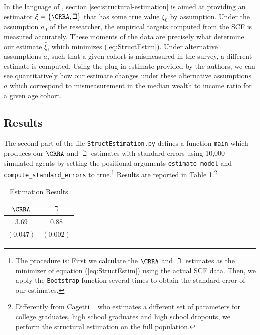 In the language of \cite{andrews2017measuring}, section \ref{sec:structural-estimation} is aimed at providing an estimator $\xi =\{\CRRA ,\beth\}$ that has some true value $\xi_0 $ by assumption. Under the assumption $a_0$ of the researcher, the empirical targets computed from the SCF is measured accurately. These moments of the data are precisely what determine our estimate $\hat{\xi}$, which minimizes (\ref{eq:StructEstim}). Under alternative assumptions $a$, such that a given cohort is mismeasured in the survey, a different estimate is computed. Using the plug-in estimate provided by the authors, we can see quantitatively how our estimate changes under these alternative assumptions $a$ which correspond to mismeasurement in the median wealth to income ratio for a given age cohort.

\hypertarget{estimation-results}{}
\subsection{Results}
The second part of the file \texttt{StructEstimation.py}
defines a function \texttt{main} which produces our $\CRRA$ and
$\beth$ estimates with standard errors using 10,000 simulated
agents by setting the positional arguments \texttt{estimate\_model} and
\texttt{compute\_standard\_errors} to true.\footnote{The procedure is: First we calculate the $\CRRA$ and
  $\beth$ estimates as the minimizer of equation
  (\ref{eq:StructEstim}) using the actual SCF data. Then, we apply the
  \texttt{Bootstrap} function several times to obtain the standard
  error of our estimates.} Results are reported in Table
\ref{tab:EstResults}.\footnote{Differently from Cagetti
  ~\citeyearpar{cagettiWprofiles} who estimates a different set of
  parameters for college graduates, high school graduates and high
  school dropouts, we perform the structural estimation on
  the full population.}


  \begin{table}[h]
    \caption{Estimation Results}\label{tab:EstResults}
    \center
    \begin{tabular}{cc}
      \hline
      $\CRRA $ & $\beth$\\
      \hline
      $3.69$ & $0.88$\\
      $(0.047)$ & $(0.002)$\\
      \hline
    \end{tabular}
  \end{table}



